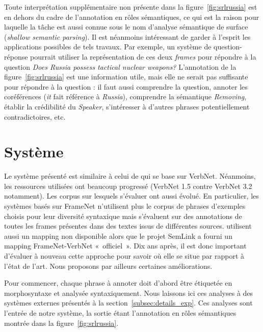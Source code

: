 Toute interprétation supplémentaire non présente dans la
figure~\ref{fig:srlrussia} est en dehors du cadre de l'annotation en rôles
sémantiques, ce qui est la raison pour laquelle la tâche est aussi connue sous
le nom d'analyse sémantique de surface (\emph{shallow semantic parsing}).  Il
est néanmoins intéressant de garder à l'esprit les applications possibles de
tels travaux. Par exemple, un système de question-réponse pourrait utiliser la
représentation de ces deux \emph{frames} pour répondre à la question \emph{Does
Russia possess tactical nuclear weapons?} L'annotation de la
figure~\ref{fig:srlrussia} est une information utile, mais elle ne serait pas
suffisante pour répondre à la question : il faut aussi comprendre la question,
annoter les coréférences (\emph{it} fait référence à \emph{Russia}), comprendre
la sémantique \emph{Removing}, établir la crédibilité du \emph{Speaker},
s'intéresser à d'autres phrases potentiellement contradictoires, etc.

\section{Système}

Le système présenté est similaire à celui de
\cite{swier2004unsupervised,swier2005exploiting} qui se base sur VerbNet.
Néanmoins, les ressources utilisées ont beaucoup progressé (VerbNet 1.5 contre
VerbNet 3.2 notamment). Les corpus sur lesquels s'évaluer ont aussi évolué. En
particulier, les systèmes basés sur FrameNet n'utilisent plus le corpus de
phrases d'exemples choisis pour leur diversité syntaxique mais s'évaluent sur
des annotations de toutes les frames présentes dans des textes issus de
différentes sources. \cite{swier2005exploiting} utilisent aussi un mapping non
disponible alors que le projet SemLink a fourni un mapping FrameNet-VerbNet
«~officiel~». Dix ans après, il est donc important d'évaluer à nouveau cette
approche pour savoir où elle se situe par rapport à l'état de l'art. Nous
proposons par ailleurs certaines améliorations.

Pour commencer, chaque phrase à annoter doit d'abord être étiquetée en
morphosyntaxe et analysée syntaxiquement. Nous laissons ici ces analyses à des
systèmes externes présentés à la section~\ref{subsec:details_exp}. Ces analyses
sont l'entrée de notre système, la sortie étant l'annotation en rôles
sémantiques montrée dans la figure~\ref{fig:srlrussia}.

